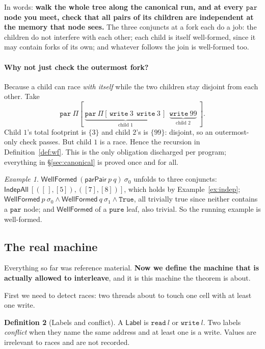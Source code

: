 \documentclass[11pt,a4paper]{article}
\theoremstyle{definition}
\newtheorem{definition}{Definition}
\theoremstyle{plain}
\theoremstyle{remark}
\newtheorem{example}[definition]{Example}
\newcommand{\st}{\sigma}
\newcommand{\wf}{\mathsf{WellFormed}}
\begin{document}
In words: \textbf{walk the whole tree along the canonical run, and at every $\texttt{par}$
node you meet, check that all pairs of its children are independent at the memory that node
sees.} The three conjuncts at a fork each do a job: the children do not interfere with each
other; each child is itself well-formed, since it may contain forks of its own; and
whatever follows the join is well-formed too.

\paragraph{Why not just check the outermost fork?}
Because a child can race \emph{with itself} while the two children stay disjoint from each
other. Take
\[
  \texttt{par}\ \Pi[\ \underbrace{\texttt{par}\ \Pi[\,\texttt{write}\ 3\ \ \texttt{write}\ 3\,]}_{\text{child }1}
                 \ \ \underbrace{\texttt{write}\ 99}_{\text{child }2}\ ] .
\]
Child $1$'s total footprint is $\{3\}$ and child $2$'s is $\{99\}$: disjoint, so an
outermost-only check passes. But child $1$ is a race. Hence the recursion in
Definition~\ref{def:wf}. This is the only obligation discharged per program; everything in
\S\ref{sec:canonical} is proved once and for all.

\begin{example}\label{ex:wf}
$\wf\ (\mathsf{parPair}\ p\ q)\ \st_0$ unfolds to three conjuncts:
$\mathsf{IndepAll}\ [([\,],[5]), ([7],[8])]$, which holds by Example~\ref{ex:indep};
$\wf\ p\ \st_0 \wedge \wf\ q\ \st_1 \wedge \mathtt{True}$, all trivially true since neither
contains a $\texttt{par}$ node; and $\wf$ of a $\texttt{pure}$ leaf, also trivial. So the
running example is well-formed.
\end{example}

\subsection{The real machine}\label{sec:indep:step}

Everything so far was reference material. \textbf{Now we define the machine that is actually
allowed to interleave}, and it is this machine the theorem is about.

First we need to detect races: two threads about to touch one cell with at least one write.

\begin{definition}[Labels and conflict]\label{def:label}
A $\mathsf{Label}$ is $\texttt{read}\ l$ or $\texttt{write}\ l$. Two labels \emph{conflict}
when they name the same address and at least one is a write. Values are irrelevant to races
and are not recorded.
\end{definition}
\end{document}
